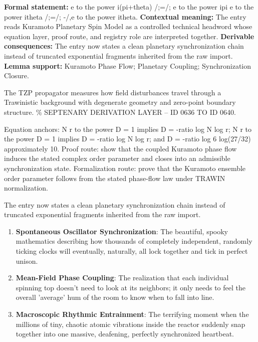 \begingroup\footnotesize\setlength{\emergencystretch}{3em}\sloppy
\textbf{Formal statement:} e to the power i(pi+theta) /;=/; e to the power ipi e to the power itheta /;=/; -/,e to the power itheta. \textbf{Contextual meaning:} The entry reads Kuramoto Planetary Spin Model as a controlled technical headword whose equation layer, proof route, and registry role are interpreted together. \textbf{Derivable consequences:} The entry now states a clean planetary synchronization chain instead of truncated exponential fragments inherited from the raw import. \textbf{Lemma support:} Kuramoto Phase Flow; Planetary Coupling; Synchronization Closure.\par
\endgroup

The TZP propagator measures how field disturbances travel through a Trawinistic background with degenerate geometry and zero-point boundary structure. \% SEPTENARY DERIVATION LAYER -- ID 0636 TO ID 0640.

Equation anchors: N r to the power D = 1 implies D = -ratio log N log r; N r to the power D = 1 implies D = -ratio log N log r; and D = -ratio log 6 log(27/32) approximately 10. Proof route: show that the coupled Kuramoto phase flow induces the stated complex order parameter and closes into an admissible synchronization state. Formalization route: prove that the Kuramoto ensemble order parameter follows from the stated phase-flow law under TRAWIN normalization.

The entry now states a clean planetary synchronization chain instead of truncated exponential fragments inherited from the raw import.
\endgroup

\begin{enumerate}[leftmargin=1.6em,itemsep=6pt,topsep=4pt]
\item \textbf{Spontaneous Oscillator Synchronization}: The beautiful, spooky mathematics describing how thousands of completely independent, randomly ticking clocks will eventually, naturally, all lock together and tick in perfect unison.
\item \textbf{Mean-Field Phase Coupling}: The realization that each individual spinning top doesn't need to look at its neighbors; it only needs to feel the overall 'average' hum of the room to know when to fall into line.
\item \textbf{Macroscopic Rhythmic Entrainment}: The terrifying moment when the millions of tiny, chaotic atomic vibrations inside the reactor suddenly snap together into one massive, deafening, perfectly synchronized heartbeat.
\end{enumerate}

